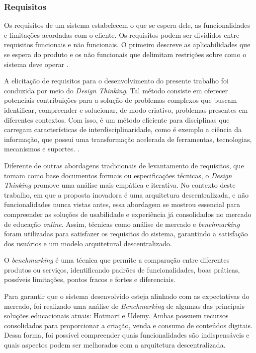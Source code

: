         \subsubsection{Requisitos}
        Os requisitos de um sistema estabelecem o que se espera dele, as funcionalidades e limitações acordadas com o cliente. Os requisitos podem ser divididos entre requisitos funcionais e não funcionais. O primeiro descreve as aplicabilidades que se espera do produto e os não funcionais que delimitam restrições sobre como o sistema deve operar \cite{sommerville2011}.

        A elicitação de requisitos para o desenvolvimento do presente trabalho foi conduzida por meio do \textit{Design Thinking}. Tal método consiste em oferecer potenciais contribuições para a solução de problemas complexos que buscam identificar, compreender e solucionar, de modo criativo, problemas presentes em diferentes contextos. Com isso, é um método eficiente para disciplinas que carregam características de interdisciplinaridade, como é exemplo a ciência da informação, que possui uma transformação acelerada de ferramentas, tecnologias, mecanismos e suportes. \cite{apocalypse2022}.

        Diferente de outras abordagens tradicionais de levantamento de requisitos, que tomam como base documentos formais ou especificações técnicas, o \textit{Design Thinking} promove uma análise mais empática e iterativa. No contexto deste trabalho, em que a proposta inovadora é uma arquitetura descentralizada, e não funcionalidades nunca vistas antes, essa abordagem se mostrou essencial para compreender as soluções de usabilidade e experiência já consolidados no mercado de educação \textit{online}. Assim, técnicas como análise de mercado e \textit{benchmarking} foram utilizadas para satisfazer os requisitos do sistema, garantindo a satisfação dos usuários e um modelo arquitetural descentralizado.

        O \textit{benchmarking} é uma técnica que permite a comparação entre diferentes produtos ou serviços, identificando padrões de funcionalidades, boas práticas, possíveis limitações, pontos fracos e fortes e diferenciais.

        Para garantir que o sistema desenvolvido esteja alinhado com as expectativas do mercado, foi realizado uma análise de \textit{Benchmarking} de algumas das principais soluções educacionais atuais: Hotmart e Udemy. Ambas possuem recursos consolidados para proporcionar a criação, venda e consumo de conteúdos digitais. Dessa forma, foi possível compreender quais funcionalidades são indispensáveis e quais aspectos podem ser melhorados com a arquitetura descentralizada.

